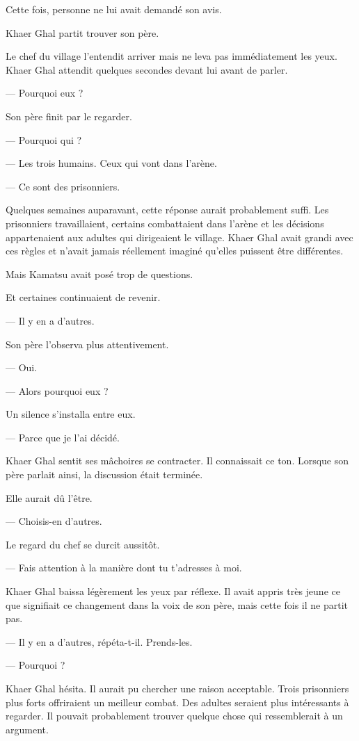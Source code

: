 Cette fois, personne ne lui avait demandé son avis.

Khaer Ghal partit trouver son père.

\scenebreak

Le chef du village l'entendit arriver mais ne leva pas immédiatement les yeux.
Khaer Ghal attendit quelques secondes devant lui avant de parler.

— Pourquoi eux ?

Son père finit par le regarder.

— Pourquoi qui ?

— Les trois humains. Ceux qui vont dans l'arène.

— Ce sont des prisonniers.

Quelques semaines auparavant, cette réponse aurait probablement suffi. Les
prisonniers travaillaient, certains combattaient dans l'arène et les décisions
appartenaient aux adultes qui dirigeaient le village. Khaer Ghal avait grandi
avec ces règles et n'avait jamais réellement imaginé qu'elles puissent être
différentes.

Mais Kamatsu avait posé trop de questions.

Et certaines continuaient de revenir.

— Il y en a d'autres.

Son père l'observa plus attentivement.

— Oui.

— Alors pourquoi eux ?

Un silence s'installa entre eux.

— Parce que je l'ai décidé.

Khaer Ghal sentit ses mâchoires se contracter. Il connaissait ce ton. Lorsque
son père parlait ainsi, la discussion était terminée.

Elle aurait dû l'être.

— Choisis-en d'autres.

Le regard du chef se durcit aussitôt.

— Fais attention à la manière dont tu t'adresses à moi.

Khaer Ghal baissa légèrement les yeux par réflexe. Il avait appris très jeune
ce que signifiait ce changement dans la voix de son père, mais cette fois il ne
partit pas.

— Il y en a d'autres, répéta-t-il. Prends-les.

— Pourquoi ?

Khaer Ghal hésita. Il aurait pu chercher une raison acceptable. Trois
prisonniers plus forts offriraient un meilleur combat. Des adultes seraient
plus intéressants à regarder. Il pouvait probablement trouver quelque chose
qui ressemblerait à un argument.

